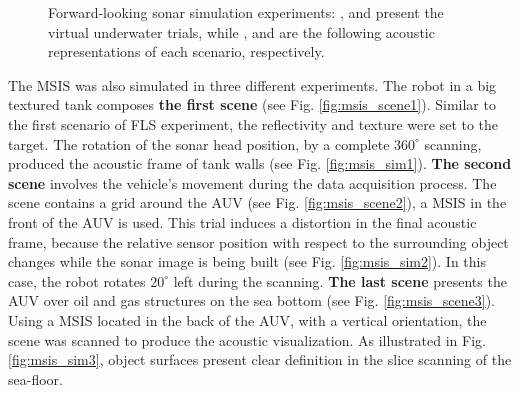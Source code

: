 \documentclass[final,5p,times]{elsarticle}
\begin{document}
\begin{figure}[!ht]
{        \label{fig:fls_sim2}
    }
    \captionsetup{justification=justified}
    \caption{Forward-looking sonar simulation experiments:
    ,  and 
    present the virtual underwater trials, while ,
     and  are the following acoustic
    representations of each scenario, respectively.}
    \label{fig:fls}
\end{figure}

The MSIS was also simulated in three different experiments. The robot in a
big textured tank composes \textbf{the first scene} (see Fig.
\ref{fig:msis_scene1}). Similar to the first scenario of FLS experiment,
the reflectivity and texture were set to the target. The rotation of the
sonar head position, by a complete $360^{\circ}$ scanning, produced the acoustic
frame of tank walls (see Fig. \ref{fig:msis_sim1}). \textbf{The second scene}
involves the vehicle's movement during the data acquisition process. The scene
contains a grid around the AUV (see Fig. \ref{fig:msis_scene2}), a MSIS in
the front of the AUV is used. This trial induces a distortion in the final
acoustic frame, because the relative sensor position with respect to the
surrounding object changes while the sonar image is being built (see
Fig. \ref{fig:msis_sim2}). In this case, the robot rotates $20^{\circ}$ left
during the scanning. \textbf{The last scene} presents the AUV over oil
and gas structures on the sea bottom (see Fig. \ref{fig:msis_scene3}).
Using a MSIS located in the back of the AUV, with a vertical orientation,
the scene was scanned to produce the acoustic visualization. As illustrated
in Fig. \ref{fig:msis_sim3}, object surfaces present clear definition in
the slice scanning of the sea-floor.
\end{document}
